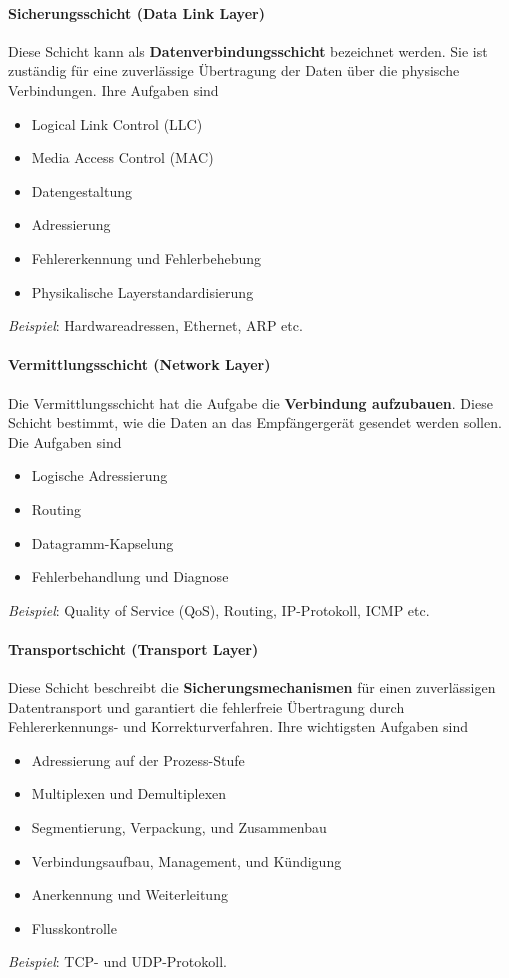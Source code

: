 \paragraph{Sicherungsschicht (Data Link Layer)} Diese Schicht kann als \textbf{Datenverbindungsschicht} bezeichnet werden. Sie ist zuständig für eine zuverlässige Übertragung der Daten über die physische Verbindungen. Ihre Aufgaben sind
\begin{itemize}
	\item Logical Link Control (LLC)
	\item Media Access Control (MAC)
	\item Datengestaltung
	\item Adressierung
	\item Fehlererkennung und Fehlerbehebung
	\item Physikalische Layerstandardisierung
\end{itemize}
\textit{Beispiel}: Hardwareadressen, Ethernet, ARP etc.

\paragraph{Vermittlungsschicht (Network Layer)} Die Vermittlungsschicht hat die Aufgabe die \textbf{Verbindung aufzubauen}. Diese Schicht bestimmt, wie die Daten an das Empfängergerät gesendet werden sollen. Die Aufgaben sind
\begin{itemize}
	\item Logische Adressierung
	\item Routing
	\item Datagramm-Kapselung
	\item Fehlerbehandlung und Diagnose
\end{itemize}
\textit{Beispiel}: Quality of Service (QoS), Routing, IP-Protokoll, ICMP etc.

\paragraph{Transportschicht (Transport Layer)} Diese Schicht beschreibt die \textbf{Sicherungsmechanismen} für einen zuverlässigen Datentransport und garantiert die fehlerfreie Übertragung durch Fehlererkennungs- und Korrekturverfahren. Ihre wichtigsten Aufgaben sind
\begin{itemize}
	\item Adressierung auf der Prozess-Stufe
	\item Multiplexen und Demultiplexen
	\item Segmentierung, Verpackung, und Zusammenbau
	\item Verbindungsaufbau, Management, und Kündigung
	\item Anerkennung und Weiterleitung
	\item Flusskontrolle
\end{itemize}
\textit{Beispiel}: TCP- und UDP-Protokoll.

